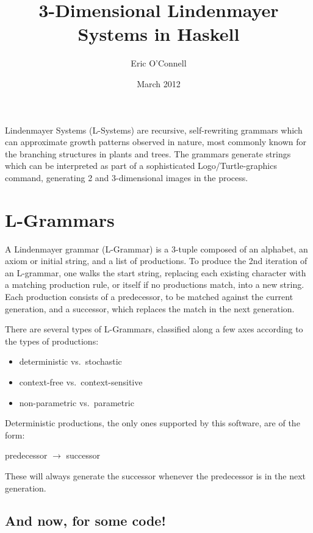 \documentclass[]{article}
\begin{document}
\title{3-Dimensional Lindenmayer Systems in Haskell}

\author{Eric O'Connell}

\date{March 2012}

\maketitle

Lindenmayer Systems (L-Systems) are recursive, self-rewriting grammars
which can approximate growth patterns observed in nature, most commonly
known for the branching structures in plants and trees. The grammars
generate strings which can be interpreted as part of a sophisticated
Logo/Turtle-graphics command, generating 2 and 3-dimensional images in
the process.

\section{L-Grammars}

A Lindenmayer grammar (L-Grammar) is a 3-tuple composed of an alphabet,
an axiom or initial string, and a list of productions. To produce the
2nd iteration of an L-grammar, one walks the start string, replacing
each existing character with a matching production rule, or itself if no
productions match, into a new string. Each production consists of a
predecessor, to be matched against the current generation, and a
successor, which replaces the match in the next generation.

There are several types of L-Grammars, classified along a few axes
according to the types of productions:

\begin{itemize}
\item
  deterministic vs.~stochastic
\item
  context-free vs.~context-sensitive
\item
  non-parametric vs.~parametric
\end{itemize}
Deterministic productions, the only ones supported by this software, are
of the form:

predecessor $\rightarrow$ successor

These will always generate the successor whenever the predecessor is in
the next generation.

\subsection{And now, for some code!}
\end{document}
